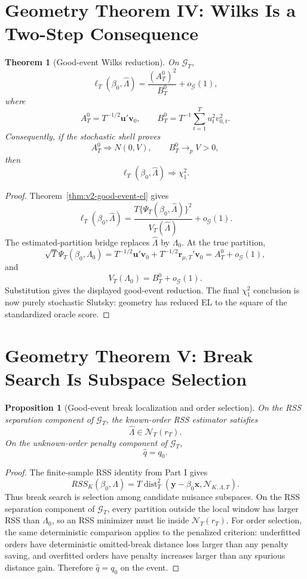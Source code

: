 \documentclass[12pt]{article}
\numberwithin{equation}{section}
\newtheorem{theorem}{Theorem}
\newtheorem{proposition}{Proposition}
\theoremstyle{definition}
\newcommand{\N}{\mathcal N}
\begin{document}
\section{Geometry Theorem IV: Wilks Is a Two-Step Consequence}

\begin{theorem}[Good-event Wilks reduction]
\label{thm:v2-good-event-wilks-reduction}
On \(\mathcal G_T\),
\[
    \ell_T(\beta_0,\widehat\Lambda)
    =\frac{(A_T^0)^2}{B_T^0}+o_{\mathcal G}(1),
\]
where
\[
    A_T^0=T^{-1/2}\bm u'\bm v_0,
    \qquad
    B_T^0=T^{-1}\sum_{t=1}^T u_t^2v_{0,t}^2.
\]
Consequently, if the stochastic shell proves
\[
    A_T^0\Rightarrow N(0,V),
    \qquad B_T^0\to_p V>0,
\]
then
\[
    \ell_T(\beta_0,\widehat\Lambda)\Rightarrow\chi_1^2.
\]
\end{theorem}

\begin{proof}
Theorem~\ref{thm:v2-good-event-el} gives
\[
    \ell_T(\beta_0,\widehat\Lambda)
    =\frac{T\{\Psi_T(\beta_0,\widehat\Lambda)\}^2}
           {V_T(\widehat\Lambda)}+o_{\mathcal G}(1).
\]
The estimated-partition bridge replaces \(\widehat\Lambda\) by \(\Lambda_0\).
At the true partition,
\[
    \sqrt T\Psi_T(\beta_0,\Lambda_0)
    =T^{-1/2}\bm u'\bm v_0
      +T^{-1/2}\bm r_{\mu,T}'\bm v_0
    =A_T^0+o_{\mathcal G}(1),
\]
and
\[
    V_T(\Lambda_0)=B_T^0+o_{\mathcal G}(1).
\]
Substitution gives the displayed good-event reduction. The final
\(\chi_1^2\) conclusion is now purely stochastic Slutsky: geometry has reduced
EL to the square of the standardized oracle score.
\end{proof}

\section{Geometry Theorem V: Break Search Is Subspace Selection}

\begin{proposition}[Good-event break localization and order selection]
\label{prop:v2-good-event-rss-selection}
On the RSS separation component of \(\mathcal G_T\), the known-order RSS
estimator satisfies
\[
    \widehat\Lambda\in\mathcal N_T(r_T).
\]
On the unknown-order penalty component of \(\mathcal G_T\),
\[
    \widehat q=q_0.
\]
\end{proposition}

\begin{proof}
The finite-sample RSS identity from Part I gives
\[
    RSS_K(\beta_0,\Lambda)
    =T\operatorname{dist}_T^2(\bm y-\beta_0\bm x,
      \N_{K,\Lambda,T}).
\]
Thus break search is selection among candidate nuisance subspaces. On the RSS
separation component of \(\mathcal G_T\), every partition outside the local
window has larger RSS than \(\Lambda_0\), so an RSS minimizer must lie inside
\(\mathcal N_T(r_T)\). For order selection, the same deterministic comparison
applies to the penalized criterion: underfitted orders have deterministic
omitted-break distance loss larger than any penalty saving, and overfitted
orders have penalty increases larger than any spurious distance gain. Therefore
\(\widehat q=q_0\) on the event.
\end{proof}
\end{document}
